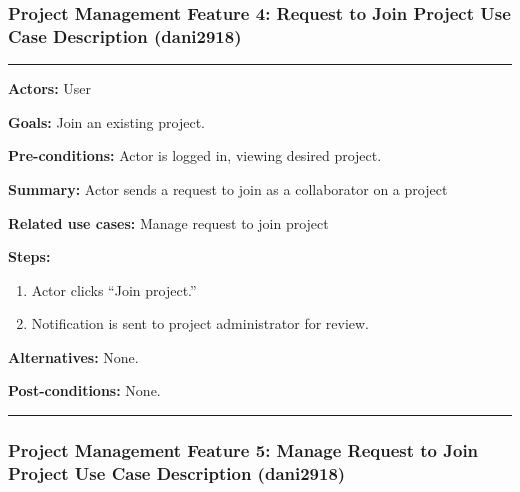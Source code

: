 \documentclass[twoside,letterpaper]{article}
\begin{document}
\newpage



\subsubsection[Project Management Feature 4: Request to Join Project Use Case Description (dani2918)]{\rmfamily\bfseries\color{black}
	Project Management Feature 4: Request to Join Project Use Case Description (dani2918)}
\hypertarget{RefHeading22059017292}{}
\bigskip

\vspace{2pt}
\hrule
\vspace{8pt}
\noindent \textbf{Actors:} User \newline

\noindent\textbf{Goals:} Join an existing project. \newline

\noindent \textbf{Pre-conditions:} Actor is logged in, viewing desired project.  \newline

\noindent \textbf{Summary:} Actor sends a request to join as a collaborator on a project\newline

\noindent \textbf{Related use cases:} Manage request to join project\newline

\noindent \textbf{Steps:} \begin{enumerate}
  \item Actor clicks ``Join project.''
  \item Notification is sent to project administrator for review.
 \end{enumerate}
\noindent \textbf{Alternatives:} None. \newline
 
\noindent \textbf{Post-conditions:} None. \newline
\vspace{8pt}
\hrule


\newpage



\subsubsection[Project Management Feature 5: Manage Request to Join Project Use Case Description (dani2918)]{\rmfamily\bfseries\color{black}
	Project Management Feature 5: Manage Request to Join Project Use Case Description (dani2918)}
\hypertarget{RefHeading22059017292}{}
\bigskip
\end{document}
